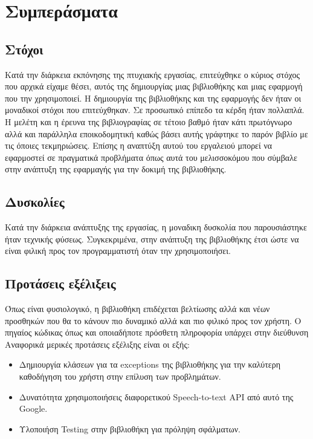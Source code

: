 \documentclass[oneside, 12pt]{book}
\begin{document}
\chapter{Συμπεράσματα}
\section{Στόχοι}
Κατά την διάρκεια εκπόνησης της πτυχιακής εργασίας, επιτεύχθηκε ο κύριος στόχος που αρχικά είχαμε θέσει, αυτός της δημιουργίας μιας βιβλιοθήκης και μιας εφαρμογή που την χρησιμοποιεί. Η δημιουργία της βιβλιοθήκης και της εφαρμογής δεν ήταν οι μοναδικοί στόχοι που επιτεύχθηκαν. Σε προσωπικό επίπεδο τα κέρδη ήταν πολλαπλά. Η μελέτη και η έρευνα της βιβλιογραφίας σε τέτοιο βαθμό ήταν κάτι πρωτόγνωρο αλλά και παράλληλα εποικοδομητική καθώς βάσει αυτής γράφτηκε το παρόν βιβλίο με τις όποιες τεκμηριώσεις. Επίσης η αναπτύξη αυτού του εργαλειού μπορεί να εφαρμοστεί σε πραγματικά προβλήματα όπως αυτά του μελισσοκόμου που σύμβαλε στην ανάπτυξη της εφαρμαγής για την δοκιμή της βιβλιοθήκης.
\section{Δυσκολίες}
Κατά την διάρκεια ανάπτυξης της εργασίας, η μοναδικη δυσκολία που παρουσιάστηκε ήταν τεχνικής φύσεως. Συγκεκριμένα, στην ανάπτυξη της βιβλιοθήκης έτσι ώστε να είναι φιλική προς τον προγραμματιστή όταν την χρησιμοποιήσει.
\section{Προτάσεις εξέλιξεις}
Όπως είναι φυσιολογικό, η βιβλιοθήκη επιδέχεται βελτίωσης αλλά και νέων προσθηκών που θα το κάνουν πιο δυναμικό αλλά και πιο φιλικό προς τον χρήστη. Ο πηγαίος κώδικας όπως και οποιαδήποτε πρόσθετη πληροφορία υπάρχει στην διεύθυνση 
Αναφορικά μερικές προτάσεις εξέλιξης είναι οι εξής:
\begin{itemize}
	\item Δημιουργία κλάσεων για τα exceptions της βιβλιοθήκης για την καλύτερη καθοδήγηση του χρήστη στην επίλυση των προβλημάτων.
	\item Δυνατότητα χρησιμοποιήσεις διαφορετικού Speech-to-text API από αυτό της Google.
	\item Υλοποιήση Testing στην βιβλιοθήκη για πρόληψη σφάλματων.
\end{itemize}
\end{document}
